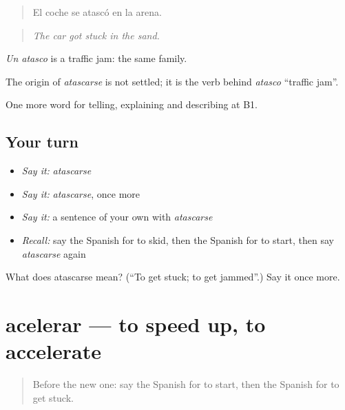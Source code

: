 \begin{quote}
El coche se atascó en la arena.
\end{quote}

\begin{quote}
\emph{The car got stuck in the sand.}
\end{quote}

\emph{Un atasco} is a traffic jam: the same family.

\begin{cousinweb}
The origin of \emph{atascarse} is not settled; it is the verb behind \emph{atasco} \textquotedblleft{}traffic jam\textquotedblright{}.
\end{cousinweb}

\begin{grammarlens}[title={What you've built}]
One more word for telling, explaining and describing at B1.
\end{grammarlens}

\subsection*{Your turn}
\begin{itemize}
\raggedright
  \item \emph{Say it:} \emph{atascarse}
  \item \emph{Say it:} \emph{atascarse}, once more
  \item \emph{Say it:} a sentence of your own with \emph{atascarse}
  \item \emph{Recall:} say the Spanish for to skid, then the Spanish for to start, then say \emph{atascarse} again
\end{itemize}

\begin{tcolorbox}[breakable,colback=teal!4,colframe=teal!35!black,title={Before you move on}]
What does atascarse mean? (\textquotedblleft{}To get stuck; to get jammed\textquotedblright{}.) Say it once more.
\end{tcolorbox}
\section[acelerar]{acelerar — to speed up, to accelerate}

\label{lesson:ES-C643-acelerar}



\begin{quote}
Before the new one: say the Spanish for to start, then the Spanish for to get stuck.
\end{quote}

